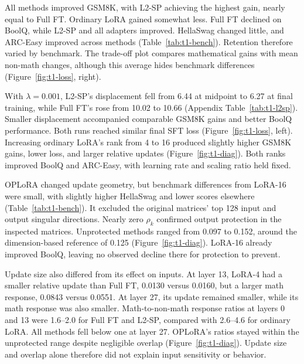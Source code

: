 \documentclass{article}
\begin{document}
All methods improved GSM8K, with L2-SP achieving the highest gain, nearly equal to Full FT. Ordinary LoRA gained somewhat less. Full FT declined on BoolQ, while L2-SP and all adapters improved. HellaSwag changed little, and ARC-Easy improved across methods (Table~\ref{tab:t1-bench}). Retention therefore varied by benchmark. The trade-off plot compares mathematical gains with mean non-math changes, although this average hides benchmark differences (Figure~\ref{fig:t1-loss}, right).

With \(\lambda=0.001\), L2-SP's displacement fell from 6.44 at midpoint to 6.27 at final training, while Full FT's rose from 10.02 to 10.66 (Appendix Table~\ref{tab:t1-l2sp}). Smaller displacement accompanied comparable GSM8K gains and better BoolQ performance. Both runs reached similar final SFT loss (Figure~\ref{fig:t1-loss}, left). Increasing ordinary LoRA's rank from 4 to 16 produced slightly higher GSM8K gains, lower loss, and larger relative updates (Figure~\ref{fig:t1-diag}). Both ranks improved BoolQ and ARC-Easy, with learning rate and scaling ratio held fixed.

OPLoRA changed update geometry, but benchmark differences from LoRA-16 were small, with slightly higher HellaSwag and lower scores elsewhere (Table~\ref{tab:t1-bench}). It excluded the original matrices' top 128 input and output singular directions. Nearly zero \(\rho_k\) confirmed output protection in the inspected matrices. Unprotected methods ranged from 0.097 to 0.152, around the dimension-based reference of 0.125 (Figure~\ref{fig:t1-diag}). LoRA-16 already improved BoolQ, leaving no observed decline there for protection to prevent.

Update size also differed from its effect on inputs. At layer 13, LoRA-4 had a smaller relative update than Full FT, 0.0130 versus 0.0160, but a larger math response, 0.0843 versus 0.0551. At layer 27, its update remained smaller, while its math response was also smaller. Math-to-non-math response ratios at layers 0 and 13 were 1.6–2.0 for Full FT and L2-SP, compared with 2.6–4.6 for ordinary LoRA. All methods fell below one at layer 27. OPLoRA's ratios stayed within the unprotected range despite negligible overlap (Figure~\ref{fig:t1-diag}). Update size and overlap alone therefore did not explain input sensitivity or behavior.
\end{document}
